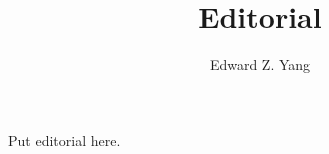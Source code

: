 \documentclass{tmr}
\title{Editorial}
\author{Edward Z. Yang\email{ezyang@cs.stanford.edu}}
\begin{document}
Put editorial here.
\end{document}
